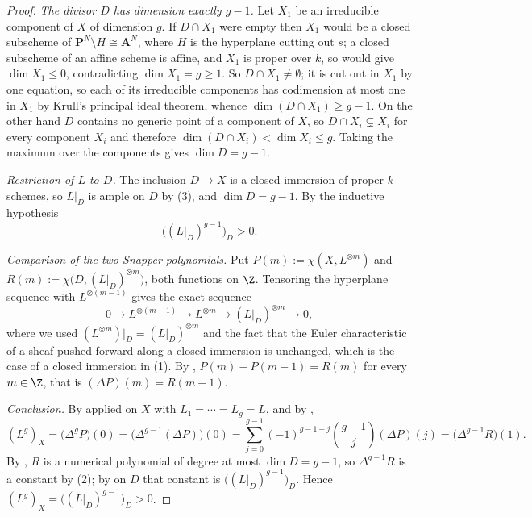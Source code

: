 \begin{proof}
\emph{The divisor $D$ has dimension exactly $g-1$.}  Let $X_1$ be an
irreducible component of $X$ of dimension $g$.  If $D\cap X_1$ were empty then
$X_1$ would be a closed subscheme of $\mathbf P^N\setminus H\cong\mathbf A^N$,
where $H$ is the hyperplane cutting out $s$; a closed subscheme of an affine
scheme is affine, and $X_1$ is proper over $k$, so
 would give $\dim X_1\leq0$, contradicting
$\dim X_1=g\geq1$.  So $D\cap X_1\neq\emptyset$; it is cut out in $X_1$ by one
equation, so each of its irreducible components has codimension at most one in
$X_1$ by Krull's principal ideal theorem, whence $\dim(D\cap X_1)\geq g-1$.  On
the other hand $D$ contains no generic point of a component of $X$, so
$D\cap X_i\subsetneq X_i$ for every component $X_i$ and therefore
$\dim(D\cap X_i)<\dim X_i\leq g$.  Taking the maximum over the components gives
$\dim D=g-1$.

\emph{Restriction of $L$ to $D$.}  The inclusion $D\to X$ is a closed
immersion of proper $k$-schemes, so $L|_D$ is ample on $D$ by
(3), and $\dim D=g-1$.  By the inductive hypothesis
\[
  \bigl((L|_D)^{g-1}\bigr)_D>0 .
\]

\emph{Comparison of the two Snapper polynomials.}  Put
$P(m):=\chi(X,L^{\otimes m})$ and $R(m):=\chi\bigl(D,(L|_D)^{\otimes m}\bigr)$,
both functions on $\Z$.  Tensoring the hyperplane sequence with
$L^{\otimes(m-1)}$ gives the exact sequence
\[
  0\longrightarrow L^{\otimes(m-1)}\longrightarrow L^{\otimes m}
  \longrightarrow(L|_D)^{\otimes m}\longrightarrow0,
\]
where we used $(L^{\otimes m})|_D=(L|_D)^{\otimes m}$ and the fact that the
Euler characteristic of a sheaf pushed forward along a closed immersion is
unchanged, which is the case of a closed immersion in
(1).  By
, $P(m)-P(m-1)=R(m)$ for every $m\in\Z$, that is
$(\Delta P)(m)=R(m+1)$.

\emph{Conclusion.}  By  applied on
$X$ with $L_1=\cdots=L_g=L$, and by
,
\[
  (L^g)_X=\bigl(\Delta^gP\bigr)(0)
  =\bigl(\Delta^{g-1}(\Delta P)\bigr)(0)
  =\sum_{j=0}^{g-1}(-1)^{g-1-j}\binom{g-1}{j}(\Delta P)(j)
  =\bigl(\Delta^{g-1}R\bigr)(1).
\]
By , $R$ is a numerical polynomial of degree at most
$\dim D=g-1$, so $\Delta^{g-1}R$ is a constant by
(2); by
 on $D$ that constant is
$\bigl((L|_D)^{g-1}\bigr)_D$.  Hence
$(L^g)_X=\bigl((L|_D)^{g-1}\bigr)_D>0$.
\end{proof}

